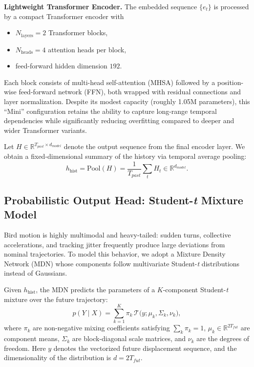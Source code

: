 \documentclass[journal]{IEEEtran}
\begin{document}
\textbf{Lightweight Transformer Encoder.}
The embedded sequence $\{e_t\}$ is processed by a compact Transformer encoder with
\begin{itemize}
	\item $N_{\text{layers}} = 2$ Transformer blocks,
	\item $N_{\text{heads}} = 4$ attention heads per block,
	\item feed-forward hidden dimension $192$.
\end{itemize}
Each block consists of multi-head self-attention (MHSA) followed by a position-wise feed-forward network (FFN), both wrapped with residual connections and layer normalization. Despite its modest capacity (roughly 1.05M parameters), this ``Mini'' configuration retains the ability to capture long-range temporal dependencies while significantly reducing overfitting compared to deeper and wider Transformer variants.

Let $H \in \mathbb{R}^{T_{past} \times d_{model}}$ denote the output sequence from the final encoder layer. We obtain a fixed-dimensional summary of the history via temporal average pooling:
\[
h_{\text{hist}} = \text{Pool}(H) = \frac{1}{T_{past}} \sum_{t} H_t \in \mathbb{R}^{d_{model}}.
\]

\subsection{Probabilistic Output Head: Student-\textit{t} Mixture Model}

Bird motion is highly multimodal and heavy-tailed: sudden turns, collective accelerations, and tracking jitter frequently produce large deviations from nominal trajectories. To model this behavior, we adopt a Mixture Density Network (MDN) whose components follow multivariate Student-\textit{t} distributions instead of Gaussians.

Given $h_{\text{hist}}$, the MDN predicts the parameters of a $K$-component Student-\textit{t} mixture over the future trajectory:
\[
p(Y \mid X) = \sum_{k=1}^{K} \pi_k \, \mathcal{T}\bigl(y; \mu_k, \Sigma_k, \nu_k\bigr),
\]
where $\pi_k$ are non-negative mixing coefficients satisfying $\sum_k \pi_k = 1$, $\mu_k \in \mathbb{R}^{2T_{fut}}$ are component means, $\Sigma_k$ are block-diagonal scale matrices, and $\nu_k$ are the degrees of freedom. Here $y$ denotes the vectorized future displacement sequence, and the dimensionality of the distribution is $d = 2T_{fut}$.
\end{document}
